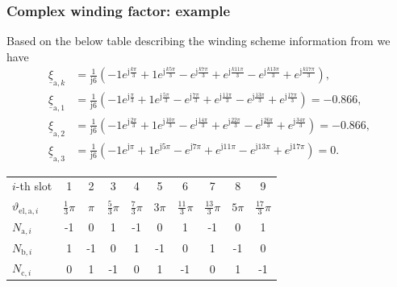 \begin{frame}
	\frametitle{Complex winding factor: example}
	Based on the below table describing the winding scheme information from  we have
	\begin{align*}
		\underline{\xi}_{\mathrm{a},k} & = \frac{1}{\mathrm{j}6}\left(-1e^{\mathrm{j}\frac{k\pi}{3}} + 1 e^{\mathrm{j}\frac{k5\pi}{3}}-e^{\mathrm{j}\frac{k7\pi}{3}} + e^{\mathrm{j}\frac{k11\pi}{3}} - e^{\mathrm{j}\frac{k13\pi}{3}}+e^{\mathrm{j}\frac{k17\pi}{3}}\right),       \\
		\underline{\xi}_{\mathrm{a},1} & = \frac{1}{\mathrm{j}6}\left(-1e^{\mathrm{j}\frac{\pi}{3}} + 1 e^{\mathrm{j}\frac{5\pi}{3}}-e^{\mathrm{j}\frac{7\pi}{3}} + e^{\mathrm{j}\frac{11\pi}{3}} - e^{\mathrm{j}\frac{13\pi}{3}}+e^{\mathrm{j}\frac{17\pi}{3}}\right) = -0.866,    \\
		\underline{\xi}_{\mathrm{a},2} & = \frac{1}{\mathrm{j}6}\left(-1e^{\mathrm{j}\frac{2\pi}{3}} + 1 e^{\mathrm{j}\frac{10\pi}{3}}-e^{\mathrm{j}\frac{14\pi}{3}} + e^{\mathrm{j}\frac{22\pi}{3}} - e^{\mathrm{j}\frac{26\pi}{3}}+e^{\mathrm{j}\frac{34\pi}{3}}\right) = -0.866, \\
		\underline{\xi}_{\mathrm{a},3} & = \frac{1}{\mathrm{j}6}\left(-1e^{\mathrm{j}\pi} + 1 e^{\mathrm{j}5\pi}-e^{\mathrm{j}7\pi} + e^{\mathrm{j}11\pi} - e^{\mathrm{j}13\pi}+e^{\mathrm{j}17\pi}\right) = 0.
	\end{align*}
	\vspace{-0.35cm}
	\begin{table}
		\centering
		\begin{tabular}{l c c c c c c c c c}
			\toprule
			$i$-th slot                            & 1                & 2     & 3                & 4                & 5      & 6                 & 7                 & 8      & 9                 \\
			$\vartheta_{\mathrm{el},\mathrm{a},i}$ & $\frac{1}{3}\pi$ & $\pi$ & $\frac{5}{3}\pi$ & $\frac{7}{3}\pi$ & $3\pi$ & $\frac{11}{3}\pi$ & $\frac{13}{3}\pi$ & $5\pi$ & $\frac{17}{3}\pi$ \\
			\midrule
			$N_{\mathrm{a},i}$                     & -1               & 0     & 1                & -1               & 0      & 1                 & -1                & 0      & 1                 \\
			$N_{\mathrm{b},i}$                     & 1                & -1    & 0                & 1                & -1     & 0                 & 1                 & -1     & 0                 \\
			$N_{\mathrm{c},i}$                     & 0                & 1     & -1               & 0                & 1      & -1                & 0                 & 1      & -1                \\
			\bottomrule
		\end{tabular}
	\end{table}
\end{frame}